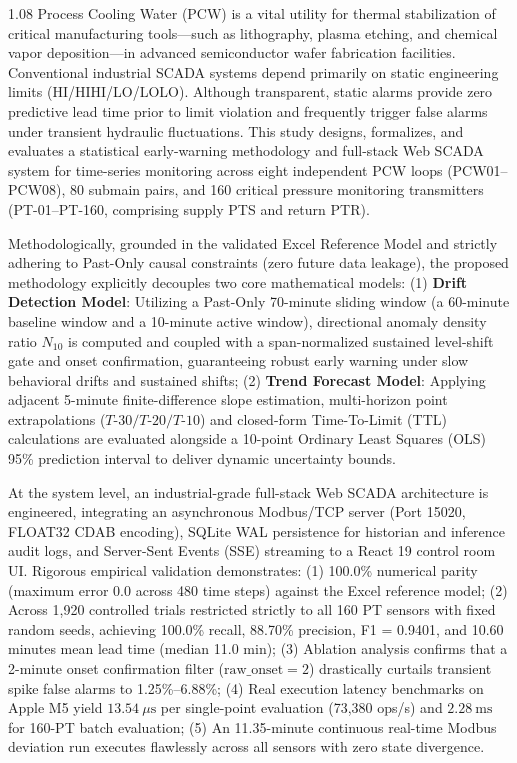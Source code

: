 \documentclass[fontset=none, a4paper, 12pt]{ctexart}
\begin{document}
\begin{spacing}{1.08}
Process Cooling Water (PCW) is a vital utility for thermal stabilization of critical manufacturing tools—such as lithography, plasma etching, and chemical vapor deposition—in advanced semiconductor wafer fabrication facilities. Conventional industrial SCADA systems depend primarily on static engineering limits (HI/HIHI/LO/LOLO). Although transparent, static alarms provide zero predictive lead time prior to limit violation and frequently trigger false alarms under transient hydraulic fluctuations. This study designs, formalizes, and evaluates a statistical early-warning methodology and full-stack Web SCADA system for time-series monitoring across eight independent PCW loops (PCW01--PCW08), 80 submain pairs, and 160 critical pressure monitoring transmitters (PT-01--PT-160, comprising supply PTS and return PTR).

Methodologically, grounded in the validated Excel Reference Model and strictly adhering to Past-Only causal constraints (zero future data leakage), the proposed methodology explicitly decouples two core mathematical models: (1) \textbf{Drift Detection Model}: Utilizing a Past-Only 70-minute sliding window (a 60-minute baseline window and a 10-minute active window), directional anomaly density ratio $N_{10}$ is computed and coupled with a span-normalized sustained level-shift gate and onset confirmation, guaranteeing robust early warning under slow behavioral drifts and sustained shifts; (2) \textbf{Trend Forecast Model}: Applying adjacent 5-minute finite-difference slope estimation, multi-horizon point extrapolations ($T\text{-}30 / T\text{-}20 / T\text{-}10$) and closed-form Time-To-Limit (TTL) calculations are evaluated alongside a 10-point Ordinary Least Squares (OLS) 95\% prediction interval to deliver dynamic uncertainty bounds.

At the system level, an industrial-grade full-stack Web SCADA architecture is engineered, integrating an asynchronous Modbus/TCP server (Port 15020, FLOAT32 CDAB encoding), SQLite WAL persistence for historian and inference audit logs, and Server-Sent Events (SSE) streaming to a React 19 control room UI. Rigorous empirical validation demonstrates: (1) 100.0\% numerical parity (maximum error 0.0 across 480 time steps) against the Excel reference model; (2) Across 1,920 controlled trials restricted strictly to all 160 PT sensors with fixed random seeds, achieving 100.0\% recall, 88.70\% precision, F1 = 0.9401, and 10.60 minutes mean lead time (median 11.0 min); (3) Ablation analysis confirms that a 2-minute onset confirmation filter ($\text{raw\_onset}=2$) drastically curtails transient spike false alarms to 1.25\%--6.88\%; (4) Real execution latency benchmarks on Apple M5 yield $13.54\ \mu\mathrm{s}$ per single-point evaluation (73,380 ops/s) and $2.28\ \mathrm{ms}$ for 160-PT batch evaluation; (5) An 11.35-minute continuous real-time Modbus deviation run executes flawlessly across all sensors with zero state divergence.


\end{spacing}
\end{document}
